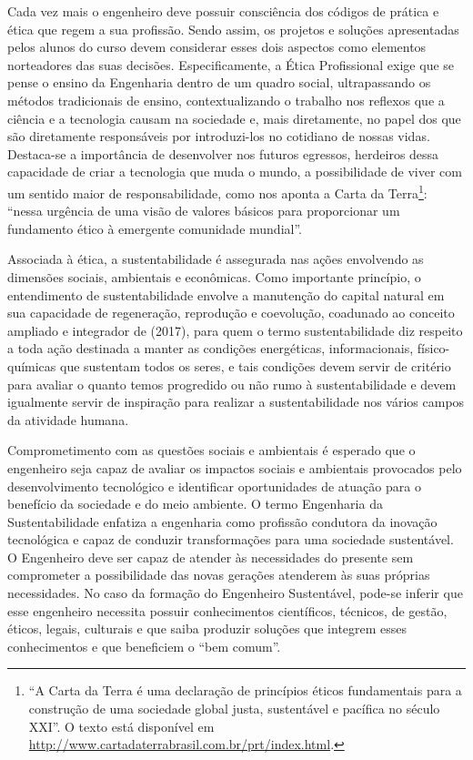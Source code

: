 Cada vez mais o engenheiro deve possuir consciência dos códigos de prática e ética que regem a sua profissão. Sendo assim, os projetos e soluções apresentadas pelos alunos do curso devem considerar esses dois aspectos como elementos norteadores das suas decisões. Especificamente, a Ética Profissional exige que se pense o ensino da Engenharia dentro de um quadro social, ultrapassando os métodos tradicionais de ensino, contextualizando o trabalho nos reflexos que a ciência e a tecnologia causam na sociedade e, mais diretamente, no papel dos que são diretamente responsáveis por introduzi-los no cotidiano de nossas vidas.  Destaca-se a importância de desenvolver nos futuros egressos, herdeiros dessa capacidade de criar a tecnologia que muda o mundo, a possibilidade de viver com um sentido maior de responsabilidade, como nos aponta a Carta da Terra\footnote{``A Carta da Terra é uma declaração de princípios éticos fundamentais para a construção de uma sociedade global justa, sustentável e pacífica no século XXI''. O texto está disponível em \url{http://www.cartadaterrabrasil.com.br/prt/index.html}.}: ``nessa urgência de uma visão de valores básicos para proporcionar um fundamento ético à emergente comunidade mundial''.

Associada à ética, a sustentabilidade é assegurada nas ações envolvendo as dimensões sociais, ambientais e econômicas. Como importante princípio, o entendimento de sustentabilidade envolve a manutenção do capital natural em sua capacidade de regeneração, reprodução e coevolução, coadunado ao conceito ampliado e integrador de  (2017), para quem o termo sustentabilidade diz respeito a toda ação destinada a manter as condições energéticas, informacionais, físico-químicas que sustentam todos os seres, e tais condições devem servir de critério para avaliar o quanto temos progredido ou não rumo à sustentabilidade e devem igualmente servir de inspiração para realizar a sustentabilidade nos vários campos da atividade humana.

Comprometimento com as questões sociais e ambientais é esperado que o engenheiro seja capaz de avaliar os impactos sociais e ambientais provocados pelo desenvolvimento tecnológico e identificar oportunidades de atuação para o benefício da sociedade e do meio ambiente. O termo Engenharia da Sustentabilidade enfatiza a engenharia como profissão condutora da inovação tecnológica e capaz de conduzir transformações para uma sociedade sustentável. O Engenheiro deve ser capaz de atender às necessidades do presente sem comprometer a possibilidade das novas gerações atenderem às suas próprias necessidades. No caso da formação do Engenheiro Sustentável, pode-se inferir que esse engenheiro necessita possuir conhecimentos científicos, técnicos, de gestão, éticos, legais, culturais e que saiba produzir soluções que integrem esses conhecimentos e que beneficiem o ``bem comum''. 

